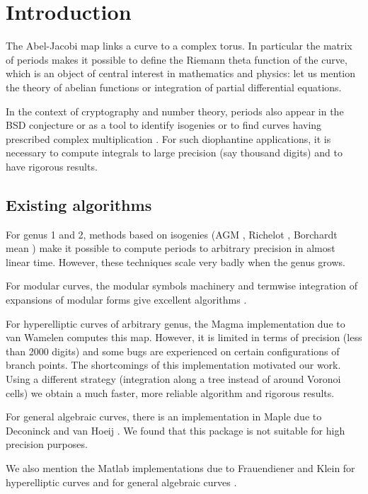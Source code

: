 \documentclass[main.tex]{subfiles}
\begin{document}
  \section{Introduction}

  The Abel-Jacobi map links a curve to a complex torus.
  In particular the matrix of periods makes it possible to define the Riemann
  theta function of the curve, which is an object of central interest in
  mathematics and physics: let us
  mention the theory of abelian functions or integration of partial differential
  equations.

  In the context of cryptography and number theory, periods also appear
  in the BSD conjecture or as a tool to identify isogenies or to find
  curves having prescribed complex multiplication \cite{vanWamelen06}.
  For such diophantine applications, it is necessary to compute
  integrals to large precision (say thousand digits) and to have
  rigorous results.

  \subsection{Existing algorithms}

  For genus 1 and 2, methods based on isogenies (AGM \cite{CremonaAGM13},
  Richelot \cite{BostMestre88}, Borchardt mean \cite{Labrande16})
  make it possible to compute periods to arbitrary precision in almost
  linear time. However, these techniques scale very badly when the genus grows.

  For modular curves, the modular symbols machinery and termwise integration of
  expansions of modular forms give excellent algorithms
  \cite[\S 3.2]{Mascot13}.

  For hyperelliptic curves of arbitrary genus, the Magma implementation
  due to van Wamelen \cite{vanWamelen06} computes this map.
  However, it is limited in terms of precision (less
  than 2000 digits) and some bugs are experienced on
  certain configurations of branch points. The shortcomings of this implementation motivated our
  work. Using a different strategy
  (integration along a tree instead of around Voronoi cells)
  we obtain a much faster, more reliable algorithm and rigorous results.

  For general algebraic curves, there is an implementation in Maple
  due to Deconinck and van Hoeij \cite{DeconinckvanHoeij01}.
  We found that this package is not suitable for high precision purposes.

  We also mention the Matlab implementations due to Frauendiener and Klein for hyperelliptic curves \cite{FrauendienerKlein2015}
  and for general algebraic curves \cite{FrauendienerKlein2011}.
\end{document}
